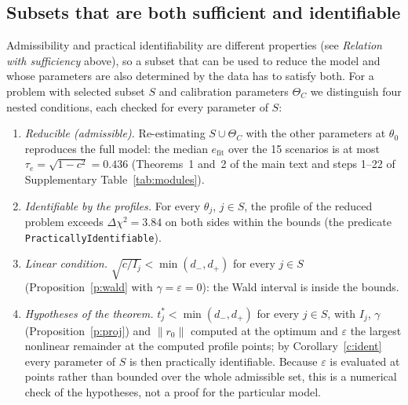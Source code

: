 \subsection*{Subsets that are both sufficient and identifiable}
Admissibility and practical identifiability are different properties (see \emph{Relation with sufficiency} above), so a subset that can be used to reduce the model and whose parameters are also determined by the data has to satisfy both. For a problem with selected subset $S$ and calibration parameters $\Theta_C$ we distinguish four nested conditions, each checked for every parameter of $S$:
\begin{enumerate}\itemsep0pt
\item \emph{Reducible (admissible).} Re-estimating $S\cup\Theta_C$ with the other parameters at $\theta_0$ reproduces the full model: the median $e_{\mathrm{fit}}$ over the 15 scenarios is at most $\tau_e=\sqrt{1-c^2}=0.436$ (Theorems~1 and~2 of the main text and steps 1--22 of Supplementary Table~\ref{tab:modules}).
\item \emph{Identifiable by the profiles.} For every $\theta_j$, $j\in S$, the profile of the reduced problem exceeds $\Delta\chi^2=3.84$ on both sides within the bounds (the predicate \texttt{PracticallyIdentifiable}).
\item \emph{Linear condition.} $\sqrt{c/I_j}<\min(d_-,d_+)$ for every $j\in S$ (Proposition~\ref{p:wald} with $\gamma=\varepsilon=0$): the Wald interval is inside the bounds.
\item \emph{Hypotheses of the theorem.} $t^{\ast}_j<\min(d_-,d_+)$ for every $j\in S$, with $I_j$, $\gamma$ (Proposition~\ref{p:proj}) and $\|r_0\|$ computed at the optimum and $\varepsilon$ the largest nonlinear remainder at the computed profile points; by Corollary~\ref{c:ident} every parameter of $S$ is then practically identifiable. Because $\varepsilon$ is evaluated at points rather than bounded over the whole admissible set, this is a numerical check of the hypotheses, not a proof for the particular model.
\end{enumerate}
